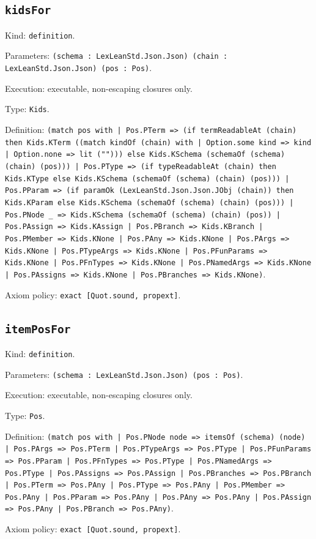\documentclass[11pt]{article}
\begin{document}
\subsection*{\texttt{kidsFor}}
\noindent Kind: \texttt{definition}.\par
\noindent Parameters: \texttt{(schema : LexLeanStd.Json.Json) (chain : LexLeanStd.Json.Json) (pos : Pos)}.\par
\noindent Execution: executable, non-escaping closures only.\par
\noindent Type: \texttt{Kids}.\par
\noindent Definition: \texttt{(match pos with | Pos.PTerm => (if termReadableAt (chain) then Kids.KTerm ((match kindOf (chain) with | Option.some kind => kind | Option.none => lit (""))) else Kids.KSchema (schemaOf (schema) (chain) (pos))) | Pos.PType => (if typeReadableAt (chain) then Kids.KType else Kids.KSchema (schemaOf (schema) (chain) (pos))) | Pos.PParam => (if paramOk (LexLeanStd.Json.Json.JObj (chain)) then Kids.KParam else Kids.KSchema (schemaOf (schema) (chain) (pos))) | Pos.PNode \_ => Kids.KSchema (schemaOf (schema) (chain) (pos)) | Pos.PAssign => Kids.KAssign | Pos.PBranch => Kids.KBranch | Pos.PMember => Kids.KNone | Pos.PAny => Kids.KNone | Pos.PArgs => Kids.KNone | Pos.PTypeArgs => Kids.KNone | Pos.PFunParams => Kids.KNone | Pos.PFnTypes => Kids.KNone | Pos.PNamedArgs => Kids.KNone | Pos.PAssigns => Kids.KNone | Pos.PBranches => Kids.KNone)}.\par
\noindent Axiom policy: \texttt{exact [Quot.sound, propext]}.\par
\subsection*{\texttt{itemPosFor}}
\noindent Kind: \texttt{definition}.\par
\noindent Parameters: \texttt{(schema : LexLeanStd.Json.Json) (pos : Pos)}.\par
\noindent Execution: executable, non-escaping closures only.\par
\noindent Type: \texttt{Pos}.\par
\noindent Definition: \texttt{(match pos with | Pos.PNode node => itemsOf (schema) (node) | Pos.PArgs => Pos.PTerm | Pos.PTypeArgs => Pos.PType | Pos.PFunParams => Pos.PParam | Pos.PFnTypes => Pos.PType | Pos.PNamedArgs => Pos.PType | Pos.PAssigns => Pos.PAssign | Pos.PBranches => Pos.PBranch | Pos.PTerm => Pos.PAny | Pos.PType => Pos.PAny | Pos.PMember => Pos.PAny | Pos.PParam => Pos.PAny | Pos.PAny => Pos.PAny | Pos.PAssign => Pos.PAny | Pos.PBranch => Pos.PAny)}.\par
\noindent Axiom policy: \texttt{exact [Quot.sound, propext]}.\par
\end{document}
